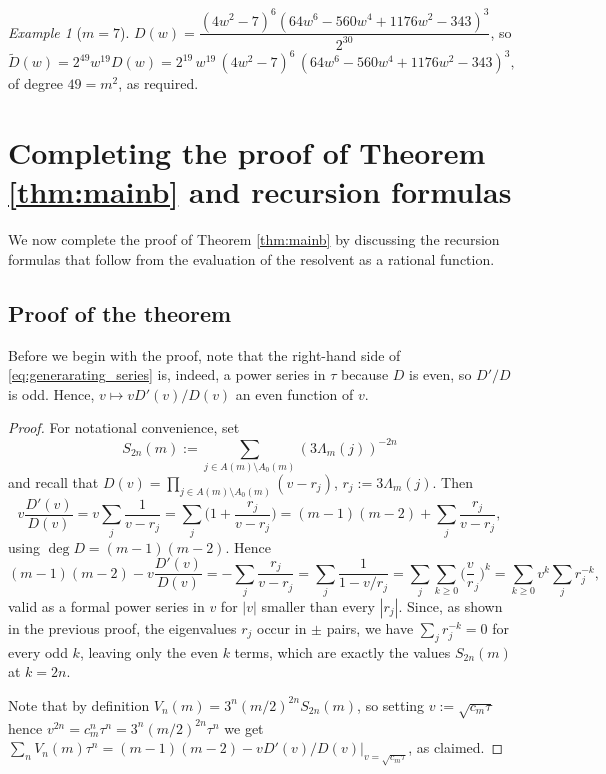 \documentclass[11pt,reqno]{amsart}
\theoremstyle{remark}
\newtheorem{example}[theorem]{Example}
\begin{document}
\begin{example}[$m = 7$]
$D(w) = \dfrac{(4w^2-7)^6(64w^6-560w^4+1176w^2-343)^3}{2^{30}}$, so
\[
\widetilde D(w) = 2^{49} w^{19} D(w) = 2^{19}\, w^{19}\,(4w^2-7)^6\,(64w^6-560w^4+1176w^2-343)^3,
\]
of degree $49 = m^2$, as required.
\end{example}



\section{Completing the proof of Theorem \ref{thm:mainb} and recursion formulas}
\label{sec:generating-series}

We now complete the proof of Theorem \ref{thm:mainb} by discussing the recursion formulas
that follow from the evaluation of the resolvent as a rational function.

\subsection{Proof of the theorem}

Before we begin with the proof, note that the right-hand side of \eqref{eq:generarating_series} is, indeed, a power series in
$\tau$ because $D$ is even, so $D'/D$ is odd.  Hence,
$v\mapsto vD'(v)/D(v)$ an even function of $v$.

\begin{proof}
For notational convenience, set
$$
S_{2n}(m):=\sum_{j\in A(m)\setminus A_0(m)}(3\Lambda_{m}(j))^{-2n}
$$
and recall that $D(v)=\prod_{j\in A(m)\setminus A_0(m)}(v-r_j)$, $r_j:=3\Lambda_{m}(j)$. Then
\[
v\frac{D'(v)}{D(v)} = v\sum_j\frac{1}{v-r_j} = \sum_j\Big(1+\frac{r_j}{v-r_j}\Big) = (m-1)(m-2) + \sum_j\frac{r_j}{v-r_j},
\]
using $\deg D=(m-1)(m-2)$. Hence
\[
(m-1)(m-2) - v\frac{D'(v)}{D(v)} = -\sum_j\frac{r_j}{v-r_j} = \sum_j\frac{1}{1-v/r_j} = \sum_j\sum_{k\ge0}\Big(\frac vr_j\Big)^k = \sum_{k\ge0}v^k\sum_jr_j^{-k},
\]
valid as a formal power series in $v$ for $|v|$ smaller than every
$|r_j|$. Since, as shown in the previous proof, the eigenvalues $r_j$ occur in $\pm$ pairs, we have $\sum_jr_j^{-k}=0$ for every odd
$k$, leaving only the even $k$
terms, which are exactly the values $S_{2n}(m)$ at $k=2n$.

Note that by definition
$V_n(m)=3^n(m/2)^{2n}S_{2n}(m)$, so setting $v:=\sqrt{c_m\tau}$ hence
$v^{2n}=c_m^n\tau^n=3^n(m/2)^{2n}\tau^n$ we get
$\sum_nV_n(m)\tau^n = (m-1)(m-2)-vD'(v)/D(v)\big|_{v=\sqrt{c_m\tau}}$, as
claimed.
\end{proof}
\end{document}
